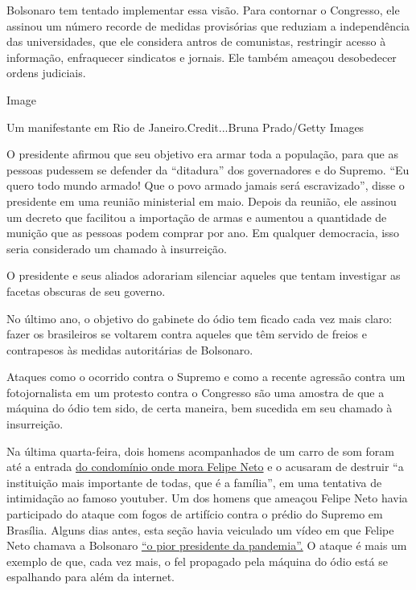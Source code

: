 Bolsonaro tem tentado implementar essa visão. Para contornar o
Congresso, ele assinou um número recorde de medidas provisórias que
reduziam a independência das universidades, que ele considera antros de
comunistas, restringir acesso à informação, enfraquecer sindicatos e
jornais. Ele também ameaçou desobedecer ordens judiciais.

Image

Um manifestante em Rio de Janeiro.Credit...Bruna Prado/Getty Images

O presidente afirmou que seu objetivo era armar toda a população, para
que as pessoas pudessem se defender da ``ditadura'' dos governadores e
do Supremo. ``Eu quero todo mundo armado! Que o povo armado jamais será
escravizado'', disse o presidente em uma reunião ministerial em maio.
Depois da reunião, ele assinou um decreto que facilitou a importação de
armas e aumentou a quantidade de munição que as pessoas podem comprar
por ano. Em qualquer democracia, isso seria considerado um chamado à
insurreição.

O presidente e seus aliados adorariam silenciar aqueles que tentam
investigar as facetas obscuras de seu governo.

No último ano, o objetivo do gabinete do ódio tem ficado cada vez mais
claro: fazer os brasileiros se voltarem contra aqueles que têm servido
de freios e contrapesos às medidas autoritárias de Bolsonaro.

Ataques como o ocorrido contra o Supremo e como a recente agressão
contra um fotojornalista em um protesto contra o Congresso são uma
amostra de que a máquina do ódio tem sido, de certa maneira, bem
sucedida em seu chamado à insurreição.

Na última quarta-feira, dois homens acompanhados de um carro de som
foram até a entrada
\href{https://esportes.yahoo.com/noticias/aliados-jair-bolsonaro-atacam-casa-felipe-neto-010129218.html}{do
condomínio onde mora Felipe Neto} e o acusaram de destruir ``a
instituição mais importante de todas, que é a família'', em uma
tentativa de intimidação ao famoso youtuber. Um dos homens que ameaçou
Felipe Neto havia participado do ataque com fogos de artifício contra o
prédio do Supremo em Brasília. Alguns dias antes, esta seção havia
veiculado um vídeo em que Felipe Neto chamava a Bolsonaro
\href{https://www.nytimes3xbfgragh.onion/2020/07/15/opinion/coronavirus-covid-brazil-bolsonaro.html}{``o
pior presidente da pandemia''.} O ataque é mais um exemplo de que, cada
vez mais, o fel propagado pela máquina do ódio está se espalhando para
além da internet.

